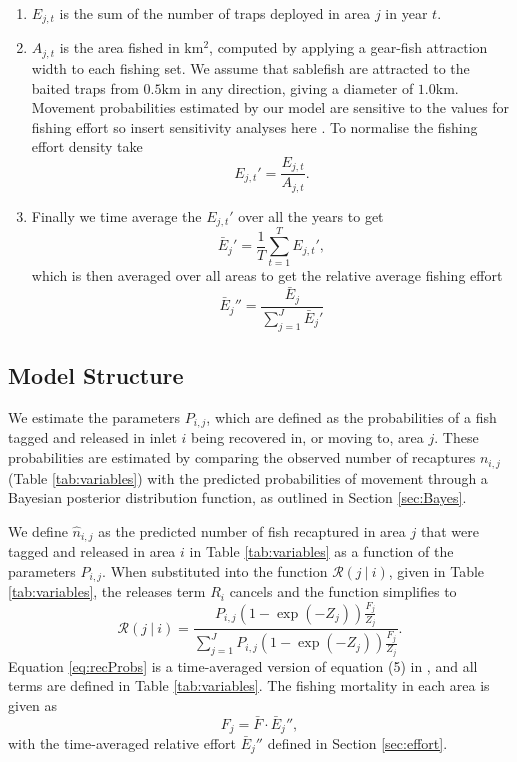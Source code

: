\documentclass[12pt]{article}
\newcommand{\sj}[1]{{\color{red}\mbox{}\marginpar{\raggedleft\hspace{0pt}*} #1}}
\newcommand{\cR}{\mathcal{R}}
\begin{document}
\begin{enumerate}
  \item $E_{j,t}$ is the sum of the number of traps deployed in area $j$ in year $t$.

  \item $A_{j,t}$ is the area fished in km$^2$, computed by applying a gear-fish attraction width to each fishing set. We assume that sablefish are attracted to the baited traps from $0.5$km in any direction, giving a diameter of $1.0$km. Movement probabilities estimated by our model are sensitive to the values for fishing effort so \sj{insert sensitivity analyses here} \citep{wyeth2006summary}. To normalise the fishing effort density take
  \[
    E_{j,t}' = \frac{E_{j,t}}{A_{j,t}}.
  \]

  \item Finally we time average the $E_{j,t}'$ over all the years to get
  \[
  \bar{E}_j' = \frac1T\sum_{t = 1}^T E_{j,t}',
  \]
  which is then averaged over all areas to get the relative average fishing effort
  \[
  \bar{E}_j'' = \frac{\bar{E}_j}{\sum_{j=1}^J \bar{E}_j'}
  \]
\end{enumerate}

\subsection{Model Structure}

We estimate the parameters $P_{i,j}$, which are defined as the probabilities of a fish tagged and released in inlet $i$ being recovered in, or moving to, area $j$. These probabilities are estimated by comparing the observed number of recaptures $n_{i,j}$ (Table \ref{tab:variables}) with the predicted probabilities of movement through a Bayesian posterior distribution function, as outlined in Section \ref{sec:Bayes}.

We define $\hat{n}_{i,j}$ as the predicted number of fish recaptured in area $j$ that were tagged and released in area $i$ in Table \ref{tab:variables} as a function of the parameters $P_{i,j}$. When substituted into the function $\cR(j~|~i)$, given in Table \ref{tab:variables}, the releases term $R_i$ cancels and the function simplifies to
\begin{equation}\label{eq:recProbs}
\cR(j~|~i) = \frac{P_{i,j} \left(1 - \exp(-Z_j) \right)\frac{F_j}{Z_j}}{\sum_{j = 1}^J P_{i,j} \left(1 - \exp(-Z_j) \right)\frac{F_j}{Z_j}}.
\end{equation}
Equation \eqref{eq:recProbs} is a time-averaged version of equation (5) in \citet{mcgarvey2002estimating}, and all terms are defined in Table \ref{tab:variables}. The fishing mortality in each area is given as
\begin{equation}
F_j = \bar{F} \cdot \bar{E}_j'',
\end{equation}
with the time-averaged relative effort $\bar{E}_j''$ defined in Section \ref{sec:effort}.
\end{document}
